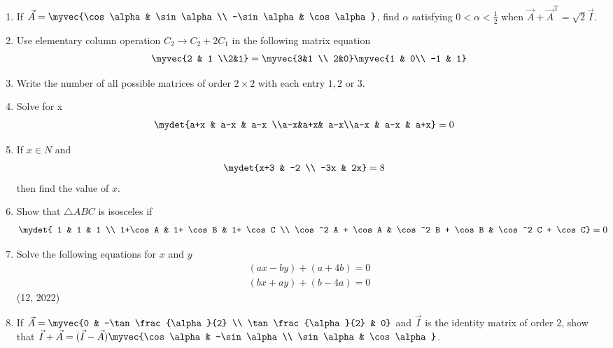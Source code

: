\begin{enumerate}[label=\thesubsection.\arabic*, ref=\thesubsection.\theenumi]
    \item If $\vec{A} = \myvec{\cos \alpha & \sin \alpha\\ -\sin \alpha & \cos \alpha}$, find $\alpha$ satisfying $0<\alpha<\frac{1}{2}$ when $\vec{A} + \vec{A}^{\text{T}} = \sqrt{2}\vec{I}$.
    \item Use elementary column operation $C_2 \rightarrow C_2 + 2C_1$ in the following matrix equation
          \begin{align*}
              \myvec{2 & 1 \\2&1} = \myvec{3&1 \\ 2&0} \myvec{1 & 0\\ -1 & 1}
          \end{align*}
    \item Write the number of all possible matrices of order $2\times2$ with each entry $1,2$ or $3$.
    \item Solve for x
          \begin{align*}
              \mydet{a+x & a-x & a-x \\a-x&a+x& a-x\\a-x & a-x & a+x} &=0
          \end{align*}
    \item If $x \in N$ and
          \begin{align*}
              \mydet{x+3 & -2 \\ -3x & 2x} &= 8
          \end{align*}
          then find the value of $x$.
    \item Show that $\triangle ABC$ is isosceles if 
          \begin{align*}
              \mydet{
              1                 & 1                 & 1                       \\
              1+\cos A          & 1+ \cos B         & 1+ \cos C               \\
              \cos^2 A + \cos A & \cos^2 B + \cos B & \cos^2 C + \cos C} & =0
          \end{align*}
\item Solve the following equations for $x$ and $y$ 
	\begin{align*}
		(ax-by)+(a+4b)=0\\
		(bx+ay)+(b-4a)=0
	\end{align*}
\hfill (12, 2022)
\item If $\vec{A}=\myvec
{0 & -\tan \frac{\alpha}{2} \\ \tan \frac{\alpha}{2} & 0}$  and $\vec{I}$ is the identity matrix of order $2$,  show that $\vec{I}+\vec{A}= (\vec{I}-\vec{A}) \myvec
{\cos \alpha & -\sin \alpha \\ \sin \alpha & \cos \alpha}$.
\end{enumerate}
